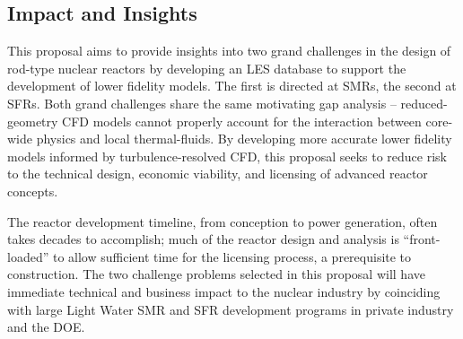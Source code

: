 



\vspace{-.25in}
\subsection{Impact and Insights}
\vspace{-.2in}

This proposal aims to provide insights into two grand challenges in the design
of rod-type nuclear reactors by developing an LES database to support the
development of lower fidelity models.  The first is directed at SMRs, the
second at SFRs.
Both grand challenges share the same
motivating gap analysis -- reduced-geometry CFD models cannot properly account
for the interaction between core-wide physics and local thermal-fluids. By
developing more accurate lower fidelity models informed by turbulence-resolved
CFD, this proposal seeks to reduce risk to the technical design, economic
viability, and licensing of advanced reactor concepts.

The reactor development timeline, from conception to power generation, often
takes decades to accomplish; much of the reactor design and analysis is
``front-loaded'' to allow sufficient time for the licensing process, a
prerequisite to construction. The two challenge problems selected in this
proposal will have immediate technical and business impact to the nuclear
industry by coinciding with large Light Water SMR and SFR development programs
in private industry and the DOE.

